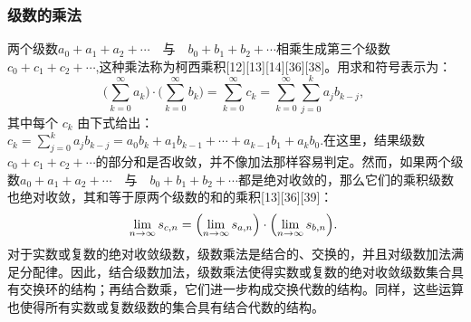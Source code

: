 \subsubsection{级数的乘法}
两个级数$a_{0} + a_{1} + a_{2} + \cdots \quad \text{与} \quad b_{0} + b_{1} + b_{2} + \cdots$相乘生成第三个级数$c_{0} + c_{1} + c_{2} + \cdots$,这种乘法称为柯西乘积[12][13][14][36][38]。用求和符号表示为：
$$
\Biggl(\sum_{k=0}^{\infty} a_{k}\Biggr) \cdot \Biggl(\sum_{k=0}^{\infty} b_{k}\Biggr) 
= \sum_{k=0}^{\infty} c_{k} 
= \sum_{k=0}^{\infty} \sum_{j=0}^{k} a_{j} b_{k-j},~
$$
其中每个 $c_{k}$ 由下式给出：$c_{k} = \sum_{j=0}^{k} a_{j} b_{k-j} = a_{0} b_{k} + a_{1} b_{k-1} + \cdots + a_{k-1} b_{1} + a_{k} b_{0}.$在这里，结果级数$c_{0} + c_{1} + c_{2} + \cdots$的部分和是否收敛，并不像加法那样容易判定。然而，如果两个级数$a_{0} + a_{1} + a_{2} + \cdots \quad \text{与} \quad b_{0} + b_{1} + b_{2} + \cdots$都是绝对收敛的，那么它们的乘积级数也绝对收敛，其和等于原两个级数的和的乘积[13][36][39]：
$$
\lim_{n \to \infty} s_{c,n} 
= \Bigl(\lim_{n \to \infty} s_{a,n}\Bigr) \cdot \Bigl(\lim_{n \to \infty} s_{b,n}\Bigr).~
$$
对于实数或复数的绝对收敛级数，级数乘法是结合的、交换的，并且对级数加法满足分配律。因此，结合级数加法，级数乘法使得实数或复数的绝对收敛级数集合具有交换环的结构；再结合数乘，它们进一步构成交换代数的结构。同样，这些运算也使得所有实数或复数级数的集合具有结合代数的结构。
